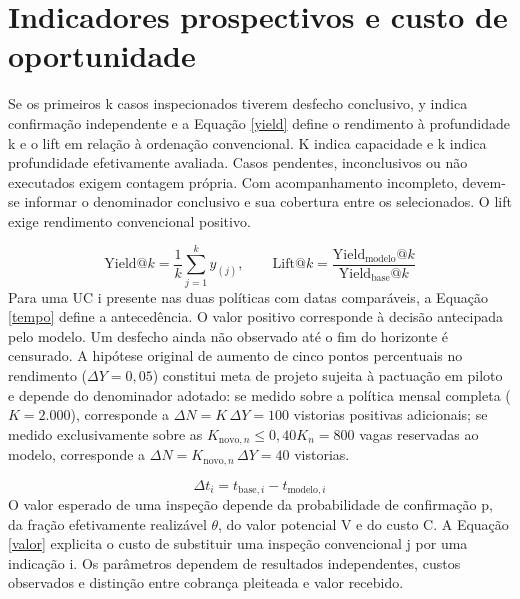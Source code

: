 \section{Indicadores prospectivos e custo de oportunidade}
Se os primeiros k casos inspecionados tiverem desfecho conclusivo, y indica confirmação independente e a Equação \eqref{yield} define o rendimento à profundidade k e o lift em relação à ordenação convencional. K indica capacidade e k indica profundidade efetivamente avaliada. Casos pendentes, inconclusivos ou não executados exigem contagem própria. Com acompanhamento incompleto, devem-se informar o denominador conclusivo e sua cobertura entre os selecionados. O lift exige rendimento convencional positivo.

\begin{equation}\label{yield}
\mathrm{Yield}@k=\frac{1}{k}\sum_{j=1}^{k}y_{(j)},\qquad \mathrm{Lift}@k=\frac{\mathrm{Yield}_{\mathrm{modelo}}@k}{\mathrm{Yield}_{\mathrm{base}}@k}
\end{equation}
Para uma UC i presente nas duas políticas com datas comparáveis, a Equação \eqref{tempo} define a antecedência. O valor positivo corresponde à decisão antecipada pelo modelo. Um desfecho ainda não observado até o fim do horizonte é censurado. A hipótese original de aumento de cinco pontos percentuais no rendimento ($\Delta Y = 0{,}05$) constitui meta de projeto sujeita à pactuação em piloto e depende do denominador adotado: se medido sobre a política mensal completa ($K = 2.000$), corresponde a $\Delta N = K\,\Delta Y = 100$ vistorias positivas adicionais; se medido exclusivamente sobre as $K_{\mathrm{novo},n} \le 0{,}40 K_n = 800$ vagas reservadas ao modelo, corresponde a $\Delta N = K_{\mathrm{novo},n}\,\Delta Y = 40$ vistorias.

\begin{equation}\label{tempo}
\Delta t_i=t_{\mathrm{base},i}-t_{\mathrm{modelo},i}
\end{equation}
O valor esperado de uma inspeção depende da probabilidade de confirmação p, da fração efetivamente realizável \ensuremath{\theta}, do valor potencial V e do custo C. A Equação \eqref{valor} explicita o custo de substituir uma inspeção convencional j por uma indicação i. Os parâmetros dependem de resultados independentes, custos observados e distinção entre cobrança pleiteada e valor recebido.

